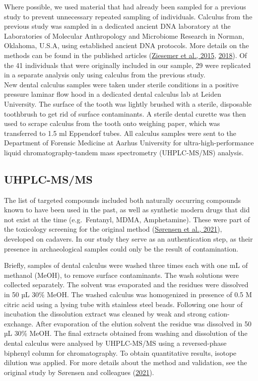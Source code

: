 \documentclass[
  b5paper,
]{book}
\begin{document}
Where possible, we used material that had already been sampled for a
previous study to prevent unnecessary repeated sampling of individuals.
Calculus from the previous study was sampled in a dedicated ancient DNA
laboratory at the Laboratories of Molecular Anthropology and Microbiome
Research in Norman, Oklahoma, U.S.A, using established ancient DNA
protocols. More details on the methods can be found in the published
articles (\protect\hyperlink{ref-ziesemer16SChallenges2015}{Ziesemer et
al., 2015}, \protect\hyperlink{ref-ziesemerGenomeCalculus2018}{2018}).
Of the 41 individuals that were originally included in our sample, 29
were replicated in a separate analysis only using calculus from the
previous study.\\
New dental calculus samples were taken under sterile conditions in a
positive pressure laminar flow hood in a dedicated dental calculus lab
at Leiden University. The surface of the tooth was lightly brushed with
a sterile, disposable toothbrush to get rid of surface contaminants. A
sterile dental curette was then used to scrape calculus from the tooth
onto weighing paper, which was transferred to 1.5 ml Eppendorf tubes.
All calculus samples were sent to the Department of Forensic Medicine at
Aarhus University for ultra-high-performance liquid
chromatography-tandem mass spectrometry (UHPLC-MS/MS) analysis.

\hypertarget{uhplc-msms}{%
\subsection{UHPLC-MS/MS}\label{uhplc-msms}}

The list of targeted compounds included both naturally occurring
compounds known to have been used in the past, as well as synthetic
modern drugs that did not exist at the time (e.g.~Fentanyl, MDMA,
Amphetamine). These were part of the toxicology screening for the
original method
(\protect\hyperlink{ref-sorensenDrugsCalculus2021}{Sørensen et al.,
2021}), developed on cadavers. In our study they serve as an
authentication step, as their presence in archaeological samples could
only be the result of contamination.

Briefly, samples of dental calculus were washed three times each with
one mL of methanol (MeOH), to remove surface contaminants. The wash
solutions were collected separately. The solvent was evaporated and the
residues were dissolved in 50 µL 30\% MeOH. The washed calculus was
homogenized in presence of 0.5 M citric acid using a lysing tube with
stainless steel beads. Following one hour of incubation the dissolution
extract was cleaned by weak and strong cation-exchange. After
evaporation of the elution solvent the residue was dissolved in 50 µL
30\% MeOH. The final extracts obtained from washing and dissolution of
the dental calculus were analysed by UHPLC-MS/MS using a reversed-phase
biphenyl column for chromatography. To obtain quantitative results,
isotope dilution was applied. For more details about the method and
validation, see the original study by Sørensen and colleagues
(\protect\hyperlink{ref-sorensenDrugsCalculus2021}{2021}).
\end{document}
